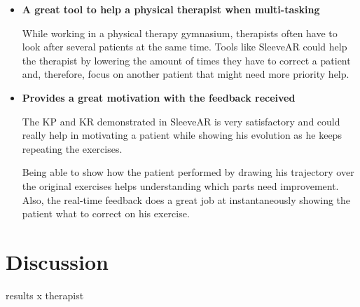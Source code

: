\begin{itemize}
\item \textbf{A great tool to help a physical therapist when multi-tasking}

While working in a physical therapy gymnasium, therapists often have to look after several patients at the same time. Tools like SleeveAR could help the therapist by lowering the amount of times they have to correct a patient and, therefore, focus on another patient that might need more priority help.


\item \textbf{Provides a great motivation with the feedback received}

The \ac{KP} and \ac{KR} demonstrated in SleeveAR is very satisfactory and could really help in motivating a patient while showing his evolution as he keeps repeating the exercises.

Being able to show how the patient performed by drawing his trajectory over the original exercises helps understanding which parts need improvement. Also, the real-time feedback does a great job at instantaneously showing the patient what to correct on his exercise.

\end{itemize}

\section{Discussion}

results x therapist 
